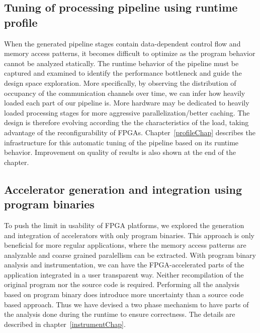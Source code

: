 \subsection{Tuning of processing pipeline using runtime profile}
When the generated pipeline stages contain data-dependent control flow and memory access patterns, 
it becomes difficult to optimize as the program behavior cannot be analyzed statically. 
The runtime behavior of the pipeline must be captured and examined to identify the performance bottleneck and
guide the design space exploration. More specifically,
by observing the distribution of occupancy of the communication channels over time, we can infer how heavily loaded
each part of our pipeline is. More hardware may be dedicated to heavily loaded processing stages for more aggressive 
parallelization/better caching. The design is therefore evolving according the the characteristics of the
load, taking advantage of the reconfigurability of FPGAs. Chapter~\ref{profileChap} describes the infrastructure for this automatic tuning
of the pipeline based on its runtime behavior. Improvement on quality of results is also shown at the end
of the chapter.

\subsection{Accelerator generation and integration using program binaries}
To push the limit in usability of FPGA platforms, we explored the generation and 
integration of accelerators with only program binaries. 
This approach is only beneficial for more regular applications,
where the memory access patterns are analyzable and coarse grained paralellism can be extracted.
With program binary analysis and instrumentation, we can have the FPGA-accelerated parts of the application
integrated in a user transparent way. Neither recompilation of the original program nor the source code
is required. Performing all the analysis based on program binary does introduce more uncertainty
than a source code based approach. Thus we have devised a two phase mechanism to have parts of the 
analysis done during the runtime to ensure correctness. The details are described
in chapter~\ref{instrumentChap}. 

